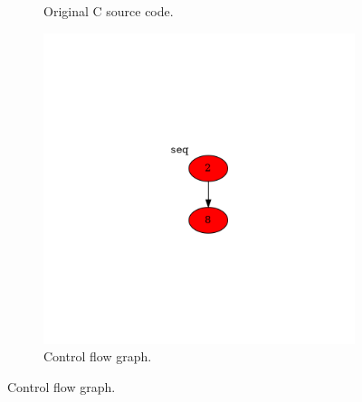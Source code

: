 \begin{figure}[htbp]
	\centering
	\begin{subfigure}[b]{0.48\textwidth}
		\centering
		
		\caption{Original C source code.}
	\end{subfigure}
	\begin{subfigure}[b]{0.50\textwidth}
		\centering
		\includegraphics[width=\textwidth]{inc/appendices/examples/hammock/example/without-break/main_0004a.png}
		\caption{Control flow graph.}
	\end{subfigure}
\end{figure}

